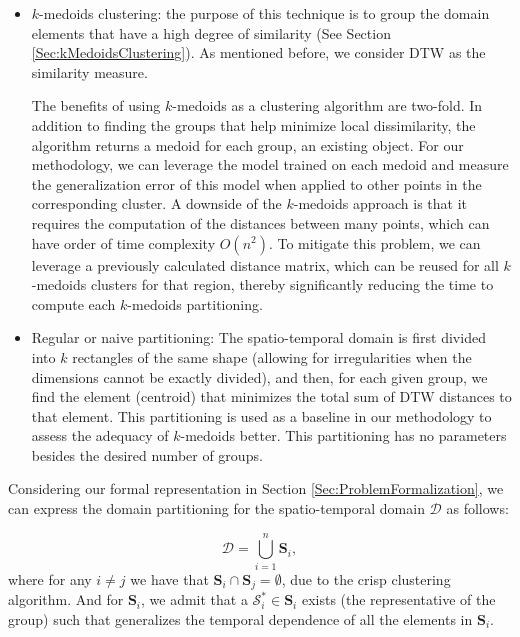 \begin{itemize}%
	\item $k$-medoids clustering: the purpose of this technique is to group the domain elements that have a high degree of similarity (See Section \ref{Sec:kMedoidsClustering}). As mentioned before, we consider DTW as the similarity measure. 
	
	The benefits of using $k$-medoids as a clustering algorithm are two-fold. In addition to finding the groups that help minimize local dissimilarity, the algorithm returns a medoid for each group, an existing object. For our methodology, we can leverage the model trained on each medoid and measure the generalization error of this model when applied to other points in the corresponding cluster. A downside of the $k$-medoids approach is that it requires the computation of the distances between many points, which can have order of time complexity $O(n^2)$. To mitigate this problem, we can leverage a previously calculated distance matrix, which can be reused for all $k$-medoids clusters for that region, thereby significantly reducing the time to compute each $k$-medoids partitioning.
	
	\item Regular or naive partitioning: The spatio-temporal domain is first divided into $k$ rectangles of the same shape (allowing for irregularities when the dimensions cannot be exactly divided), and then, for each given group, we find the element (centroid) that minimizes the total sum of DTW distances to that element. This partitioning is used as a baseline in our methodology to assess the adequacy of $k$-medoids better. This partitioning has no parameters besides the desired number of groups.
\end{itemize}

Considering our formal representation in Section \ref{Sec:ProblemFormalization}, we can express the domain partitioning for the spatio-temporal domain $\mathcal{D}$ as follows:

\begin{equation}
\mathcal{D} = \bigcup_{i=1}^{n} \mathbf{S}_{i},
\end{equation}
where for any $i\neq j$ we have that $\mathbf{S}_{i} \cap \mathbf{S}_{j} = \emptyset$, due to the crisp clustering algorithm. And for $\mathbf{S}_{i}$, we admit that a $\mathcal{S}_{i}^{*} \in \mathbf{S}_{i}$ exists (the representative of the group) such that generalizes the temporal dependence of all the elements in $\mathbf{S}_{i}$.


